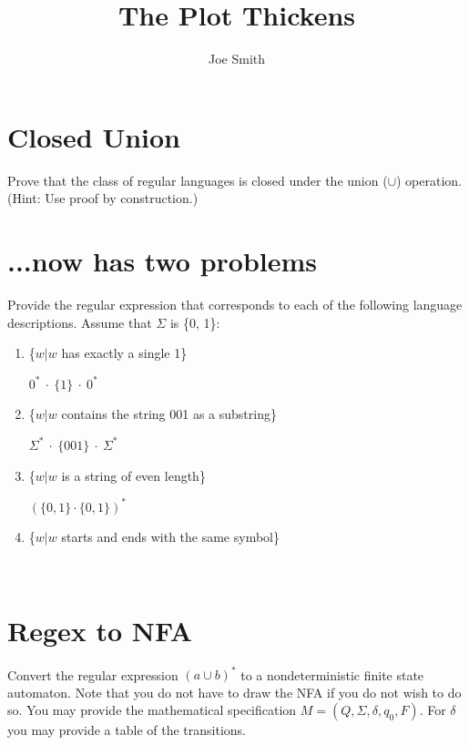 \documentclass[10pt,reqno,sumlimits]{amsart}
\theoremstyle{plain}
\theoremstyle{definition}
\newcommand{\1}{{\bf 1}}
\numberwithin{equation}{section}
\begin{document}
\title[Assignment 2]{The Plot Thickens}
\author{Joe Smith}



\maketitle



\section {Closed Union}
Prove that the class of regular languages is closed under the union ($\cup$) operation. (Hint: Use proof by construction.)

\section{...now has two problems}
Provide the regular expression that corresponds to each of the following language descriptions. Assume that $\Sigma$ is \{0, 1\}:

\begin{enumerate}
\item \{$w|w$ has exactly a single 1\}

\hspace{0.5in} $0^*\ \cdot\ \{1\}\ \cdot\ 0^*$

\item \{$w|w$ contains the string 001 as a substring\}

\hspace{0.5in} $\Sigma^*\ \cdot\ \{001\}\ \cdot\ \Sigma^*$

\item \{$w|w$ is a string of even length\}

\hspace{0.5in} $ (\{0,1\} \cdot \{0,1\})^*$

\item \{$w|w$ starts and ends with the same symbol\}

\hspace{0.5in} $  $

\end{enumerate}

\section{Regex to NFA}
Convert the regular expression $(a \cup b)^*$ to a nondeterministic finite state automaton. Note that you do not have to draw the NFA if you do not wish to do so. You may provide the mathematical specification $M = (Q, \Sigma, \delta, q_0 , F )$. For $\delta$ you may provide a table of the transitions.
\end{document}

